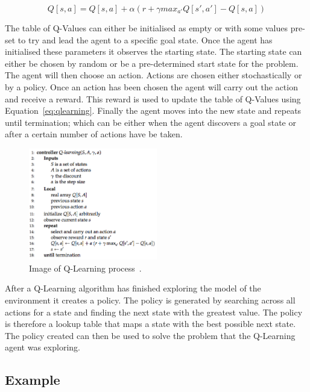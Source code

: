\begin{equation} \label{eq:qlearning}
Q[s,a] = Q[s,a] + {\alpha}(r+ {\gamma}max_{a'} Q[s',a'] - Q[s,a])
\end{equation}

The table of Q-Values can either be initialised as empty or with some values pre-set to try and lead the agent to a specific goal state. Once the agent has initialised these parameters it observes the starting state. The starting state can either be chosen by random or be a pre-determined start state for the problem. The agent will then choose an action. Actions are chosen either stochastically or by a policy. Once an action has been chosen the agent will carry out the action and receive a reward. This reward is used to update the table of Q-Values using Equation~\ref{eq:qlearning}. Finally the agent moves into the new state and repeats until termination; which can be either when the agent discovers a goal state or after a certain number of actions have be taken.

\begin{figure}[H]
  \begin{center}
    	  \includegraphics[width=0.5\textwidth]{figures/q-learning.jpg}
    \end{center}
    \caption{Image of Q-Learning process~\cite{poole2010artificial}.}
    \label{fig:qlearning}
\end{figure}

After a Q-Learning algorithm has finished exploring the model of the environment it creates a policy. The policy is generated by searching across all actions for a state and finding the next state with the greatest value. The policy is therefore a lookup table that maps a state with the best possible next state. The policy created can then be used to solve the problem that the Q-Learning agent was exploring.~\cite{poole2010artificial}

\subsection{Example} \label{example}